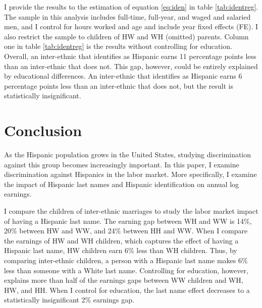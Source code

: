 \documentclass{wptemp}
\begin{document}
I provide the results to the estimation of equation \ref{eq:iden} in table \ref{tab:identreg}. The sample in this analysis includes full-time, full-year, and waged and salaried men, and I control for hours worked and age and include year fixed effects (FE). I also restrict the sample to children of HW and WH (omitted) parents. Column one in table \ref{tab:identreg} is the results without controlling for education. Overall, an inter-ethnic that identifies as Hispanic earns 11 percentage points less than an inter-ethnic that does not. This gap, however, could be entirely explained by educational differences. An inter-ethnic that identifies as Hispanic earns 6 percentage points less than an inter-ethnic that does not, but the result is statistically insignificant.

\section{Conclusion}\label{sec:con1}

As the Hispanic population grows in the United States, studying discrimination against this group becomes increasingly important. In this paper, I examine discrimination against Hispanics in the labor market. More specifically, I examine the impact of Hispanic last names and Hispanic identification on annual log earnings. 

I compare the children of inter-ethnic marriages to study the labor market impact of having a Hispanic last name. The earning gap between WH and WW is 14\%, 20\% between HW and WW, and 24\% between HH and WW. When I compare the earnings of HW and WH children, which captures the effect of having a Hispanic last name, HW children earn  6\% less than WH children. Thus, by comparing inter-ethnic children, a person with a Hispanic last name makes 6\% less than someone with a White last name. Controlling for education, however, explains more than half of the earnings gaps between WW children and WH, HW, and HH. When I control for education, the last name effect decreases to a statistically insignificant 2\% earnings gap.
\end{document}
